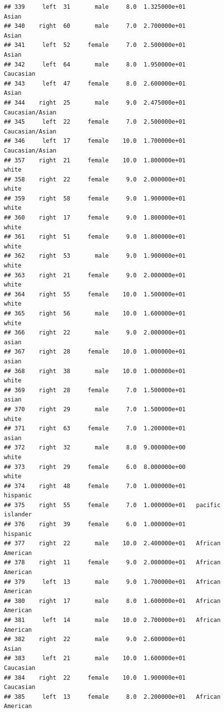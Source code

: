 \documentclass[]{article}
\begin{document}
\begin{verbatim}
## 339     left  31       male     8.0  1.325000e+01              Asian
## 340    right  60       male     7.0  2.700000e+01              Asian
## 341     left  52     female     7.0  2.500000e+01              Asian
## 342     left  64       male     8.0  1.950000e+01          Caucasian
## 343     left  47     female     8.0  2.600000e+01              Asian
## 344    right  25       male     9.0  2.475000e+01    Caucasian/Asian
## 345     left  22     female     7.0  2.500000e+01    Caucasian/Asian
## 346     left  17     female    10.0  1.700000e+01    Caucasian/Asian
## 357    right  21     female    10.0  1.800000e+01              white
## 358    right  22     female     9.0  2.000000e+01              white
## 359    right  58     female     9.0  1.900000e+01              white
## 360    right  17     female     9.0  1.800000e+01              white
## 361    right  51     female     9.0  1.800000e+01              white
## 362    right  53       male     9.0  1.900000e+01              white
## 363    right  21     female     9.0  2.000000e+01              white
## 364    right  55     female    10.0  1.500000e+01              white
## 365    right  56       male    10.0  1.600000e+01              white
## 366    right  22       male     9.0  2.000000e+01              asian
## 367    right  28     female    10.0  1.000000e+01              asian
## 368    right  38       male    10.0  1.000000e+01              white
## 369    right  28     female     7.0  1.500000e+01              asian
## 370    right  29       male     7.0  1.500000e+01              white
## 371    right  63     female     7.0  1.200000e+01              asian
## 372    right  32       male     8.0  9.000000e+00              white
## 373    right  29     female     6.0  8.000000e+00              white
## 374    right  48     female     7.0  1.000000e+01           hispanic
## 375    right  55     female     7.0  1.000000e+01   pacific islander
## 376    right  39     female     6.0  1.000000e+01           hispanic
## 377    right  22       male    10.0  2.400000e+01   African American
## 378    right  11     female     9.0  2.000000e+01   African American
## 379     left  13       male     9.0  1.700000e+01   African American
## 380    right  17       male     8.0  1.600000e+01   African American
## 381     left  14       male    10.0  2.700000e+01   African American
## 382    right  22       male     9.0  2.600000e+01              Asian
## 383     left  21       male    10.0  1.600000e+01          Caucasian
## 384    right  22     female    10.0  1.900000e+01          Caucasian
## 385     left  13     female     8.0  2.200000e+01   African American

\end{verbatim}
\end{document}
